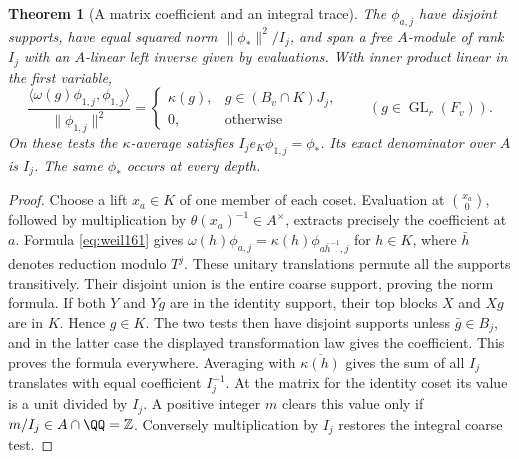 \documentclass[a4paper,11pt]{article}
\newtheorem{theorem}[proposition]{Theorem}
\theoremstyle{definition}
\theoremstyle{remark}
\newcommand{\ZZ}{\mathbb Z}\newcommand{\ord}{\operatorname{ord}}
\numberwithin{equation}{section}
\newcommand{\GL}{\operatorname{GL}}
\begin{document}
\begin{theorem}[A matrix coefficient and an integral trace]
\label{thm:tests165}
The \(\phi_{a,j}\) have disjoint supports, have equal squared
norm \(\|\phi_*\|^2/I_j\), and span a free \(A\)-module of rank
\(I_j\) with an \(A\)-linear left inverse given by evaluations.
With inner product linear in the first variable,
\[
 \frac{\langle\omega(g)\phi_{1,j},\phi_{1,j}\rangle}
      {\|\phi_{1,j}\|^2}
    =\begin{cases}
       \kappa(g),&g\in (B_v\cap K)J_j,\\
       0,&\text{otherwise}
     \end{cases}
          \qquad (g\in\GL_r(F_v)).
\]
On these tests the \(\kappa\)-average satisfies
\(I_j e_K\phi_{1,j}=\phi_*\). Its exact denominator over \(A\)
is \(I_j\). The same \(\phi_*\) occurs at every depth.
\end{theorem}
\begin{proof}
Choose a lift \(x_a\in K\) of one member of each coset. Evaluation
at \(\binom{x_a}{0}\), followed by multiplication by
\(\theta(x_a)^{-1}\in A^\times\), extracts precisely the
coefficient at \(a\). Formula \eqref{eq:weil161} gives
\(\omega(h)\phi_{a,j}=\kappa(h)\phi_{a\bar h^{-1},j}\) for
\(h\in K\), where \(\bar h\) denotes reduction modulo \(T^j\).
These unitary translations permute all the supports transitively.
Their disjoint union is the entire coarse support, proving the
norm formula. If both \(Y\) and \(Yg\) are in the identity
support, their top blocks \(X\) and \(Xg\) are in \(K\).
Hence \(g\in K\). The two tests then have disjoint supports
unless \(\bar g\in B_j\), and in the latter case the displayed
transformation law gives the coefficient. This proves the
formula everywhere. Averaging with \(\overline{\kappa(h)}\)
gives the sum of all \(I_j\) translates with equal coefficient
\(I_j^{-1}\). At the matrix for the identity coset its value
is a unit divided by \(I_j\). A positive integer \(m\) clears
this value only if \(m/I_j\in A\cap\QQ=\ZZ\). Conversely
multiplication by \(I_j\) restores the integral coarse test.
\end{proof}
\end{document}

